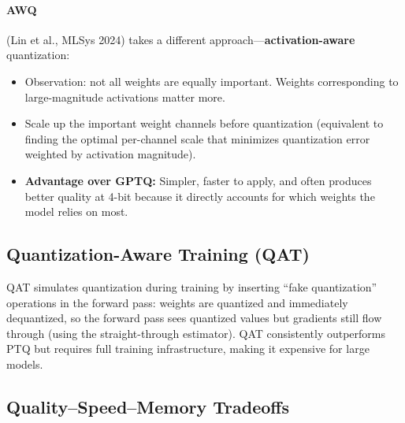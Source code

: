 \paragraph{AWQ} (Lin et al., MLSys 2024) takes a different approach---\textbf{activation-aware}
quantization:
\begin{itemize}
    \item Observation: not all weights are equally important.  Weights corresponding
          to large-magnitude activations matter more.
    \item Scale up the important weight channels before quantization (equivalent to
          finding the optimal per-channel scale that minimizes quantization error
          weighted by activation magnitude).
    \item \textbf{Advantage over GPTQ:} Simpler, faster to apply, and often produces
          better quality at 4-bit because it directly accounts for which weights
          the model relies on most.
\end{itemize}

\subsection{Quantization-Aware Training (QAT)}

QAT simulates quantization during training by inserting ``fake quantization'' operations
in the forward pass: weights are quantized and immediately dequantized, so the forward
pass sees quantized values but gradients still flow through (using the straight-through
estimator).  QAT consistently outperforms PTQ but requires full training infrastructure,
making it expensive for large models.

\subsection{Quality--Speed--Memory Tradeoffs}

